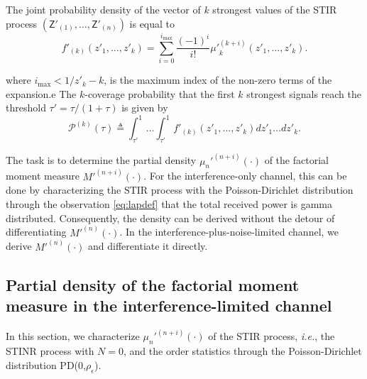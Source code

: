 \documentclass[lettersize,journal]{IEEEtran}
\begin{document}
The joint probability density of the vector of $k$ strongest values of the STIR process $(\mathsf{Z}'_{(1)}, \dots, \mathsf{Z}'_{(n)})$ is equal to
\begin{equation}
  \label{eq:jointprobability}
  f'_{(k)}(z'_1,\dots,z'_k)= \sum^{i_{\text{max}}}_{i=0}\frac{(-1)^i}{i!}{\mu'}_k^{(k+i)}(z'_1,\dots,z'_k).
\end{equation}

where $i_{\text{max}}<1/z'_k-k$, is the maximum index of the non-zero terms of the expansion.e
The $k$-coverage probability that the first $k$ strongest signals reach the threshold $\tau' =\tau/(1+\tau)$ is given by
\begin{equation}
  \mathcal{P}^{(k)}(\tau) \triangleq  \int_{\tau'}^1\dots \int_{\tau'}^1 f'_{(k)}({z'_1},\dots,{z'_k})dz'_1 \dots d{z'_k}.
\end{equation}

The task is to determine the partial density $\mu_n'^{(n+i)}(\cdot)$ of the factorial moment measure $M'^{(n+i)}(\cdot)$. For the interference-only channel, this can be done by characterizing the STIR process with the Poisson-Dirichlet distribution through the observation \eqref{eq:lapdef} that the total received power is gamma distributed. Consequently, the density can be derived without the detour of differentiating $M'^{(n)}(\cdot)$. In the interference-plus-noise-limited channel, we derive $M'^{(n)}(\cdot)$ and differentiate it directly.



\subsection{Partial density of the factorial moment measure in the interference-limited channel}
In this section, we characterize $\mu_n'^{(n+i)}(\cdot)$ of the STIR process, \textit{i.e.}, the STINR process with $N=0$, and the order statistics through the Poisson-Dirichlet distribution PD(0,$\rho_{\epsilon}$). 
\end{document}
